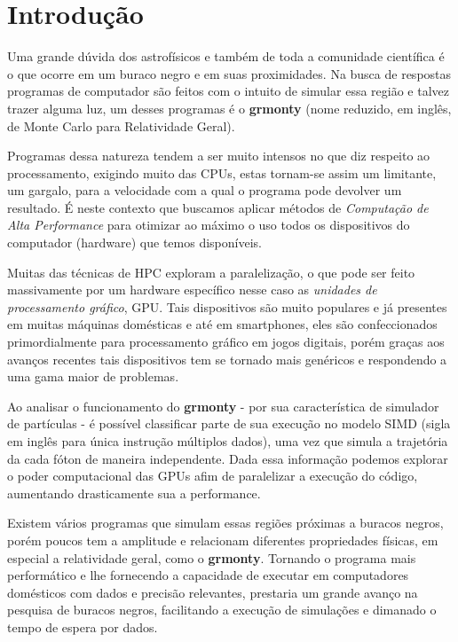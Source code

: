 \chapter{Introdução}
\label{cap:introducao}

Uma grande dúvida dos astrofísicos e também de toda a comunidade científica é o que ocorre em um buraco negro e em suas proximidades. Na busca de respostas programas de computador são feitos com o intuito de simular essa região e talvez trazer alguma luz, um desses programas é o \textbf{grmonty}\citep{Dolence:09} (nome reduzido, em inglês, de Monte Carlo para Relatividade Geral).

Programas dessa natureza tendem a ser muito intensos no que diz respeito ao processamento, exigindo muito das CPUs, estas tornam-se assim um limitante, um gargalo, para a velocidade com a qual o programa pode devolver um resultado. É neste contexto que buscamos aplicar métodos de \emph{Computação de Alta Performance} para otimizar ao máximo o uso todos os dispositivos do computador (hardware) que temos disponíveis.

Muitas das técnicas de HPC exploram a paralelização, o que pode ser feito massivamente por um hardware específico nesse caso as \emph{unidades de processamento gráfico}, GPU. Tais dispositivos são muito populares e já presentes em muitas máquinas domésticas e até em smartphones, eles são confeccionados primordialmente para processamento gráfico em jogos digitais, porém graças aos avanços recentes tais dispositivos tem se tornado mais genéricos e respondendo a uma gama maior de problemas.

Ao analisar o funcionamento do \textbf{grmonty} - por sua característica de simulador de partículas - é possível classificar parte de sua execução no modelo SIMD (sigla em inglês para única instrução múltiplos dados), uma vez que simula a trajetória da cada fóton de maneira independente. Dada essa informação podemos explorar o poder computacional das GPUs afim de paralelizar a execução do código, aumentando drasticamente sua a performance.

Existem vários programas que simulam essas regiões próximas a buracos negros, porém poucos tem a amplitude e relacionam diferentes propriedades físicas, em especial a relatividade geral, como o \textbf{grmonty}. Tornando o programa mais performático e lhe fornecendo a capacidade de executar em computadores domésticos com dados e precisão relevantes, prestaria um grande avanço na pesquisa de buracos negros, facilitando a execução de simulações e dimanado o tempo de espera por dados.

